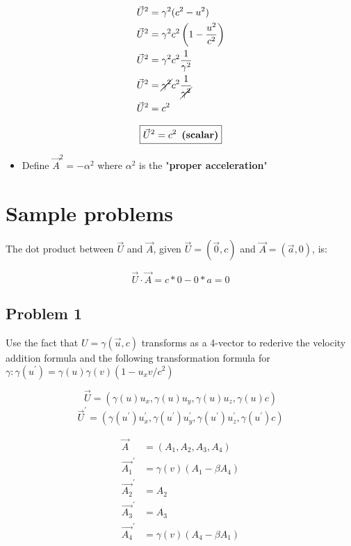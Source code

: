 \documentclass[12pt,a4paper]{article}
\begin{document}
 	\begin{align*}
 		\vec{U}^2 &= \gamma^2(c^2 - u^2)\\
 		\vec{U}^2 &= \gamma^2c^2\left(1 - \frac{u^2}{c^2}\right)\\
 		\vec{U}^2 &= \gamma^2c^2\frac{1}{\gamma^2}\\
 		\vec{U}^2 &= \cancel{\gamma^2}c^2\frac{1}{\cancel{\gamma^2}}\\
 		\vec{U}^2 &= c^2\\
 	\end{align*}
 	
	$$\boxed{\vec{U}^2 = c^2 \hspace{0.5em}\textbf{(scalar)}}$$
	
	\begin{itemize}
		\item Define $\vec{A}^2 = -\alpha^2$ where $\alpha^2$ is the "\textbf{proper acceleration}"
	\end{itemize}
	
	\section{Sample problems}
	
	The dot product between $\vec{U}$ and $\vec{A}$, given $\vec{U} = (\vec{0}, c)$ and $\vec{A} = (\vec{a}, 0)$, is:
	
	$$\vec{U}\cdot\vec{A} = c*0 - 0*a = 0$$
	
	\subsection{Problem 1}
	
	Use the fact that $U = \gamma(\vec{u}, c)$ transforms as a 4-vector to rederive the velocity addition formula and the following transformation formula for $\gamma: \gamma(u^{\prime}) = \gamma(u)\gamma(v)(1 - u_xv/c^2)$ 
	
	
	$$\vec{U} = (\gamma(u)u_x, \gamma(u)u_y, \gamma(u)u_z, \gamma(u)c)$$
	$$\vec{U}^{\prime} = (\gamma(u^{\prime})u_x^{\prime}, \gamma(u^{\prime})u_y^{\prime}, \gamma(u^{\prime})u_z^{\prime}, \gamma(u^{\prime})c)$$
	
	\begin{align*}
		\vec{A} &= (A_1, A_2, A_3, A_4)\\
		\vec{A_1}^{\prime} &= \gamma(v)(A_1 - \beta A_4)\\
		\vec{A_2}^{\prime} &= A_2\\
		\vec{A_3}^{\prime} &= A_3\\
		\vec{A_4}^{\prime} &= \gamma(v)(A_4 - \beta A_1)\\
	\end{align*}
	
\end{document}
